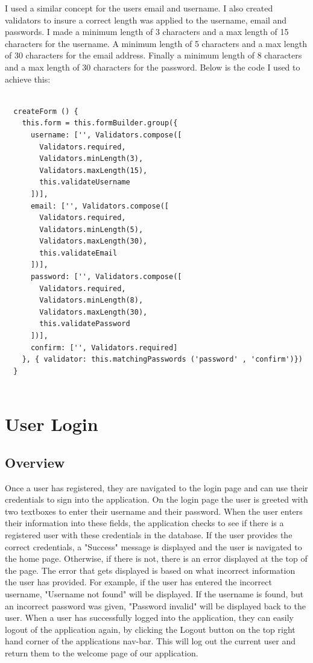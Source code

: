 I used a similar concept for the users email and username. I also created validators to insure a correct length was applied to the username, email and passwords. I made a minimum length of 3 characters and a max length of 15 characters for the username. A minimum length of 5 characters and a max length of 30 characters for the email address. Finally a minimum length of 8 characters and a max length of 30 characters for the password. Below is the code I used to achieve this:
\begin{lstlisting}

  createForm () {
    this.form = this.formBuilder.group({
      username: ['', Validators.compose([
        Validators.required,
        Validators.minLength(3),
        Validators.maxLength(15),
        this.validateUsername
      ])],
      email: ['', Validators.compose([
        Validators.required,
        Validators.minLength(5),
        Validators.maxLength(30),
        this.validateEmail
      ])],
      password: ['', Validators.compose([
        Validators.required,
        Validators.minLength(8),
        Validators.maxLength(30),
        this.validatePassword
      ])],
      confirm: ['', Validators.required]
    }, { validator: this.matchingPasswords ('password' , 'confirm')})
  }
  
\end{lstlisting}

\section{User Login}

\subsection{Overview}
Once a user has registered, they are navigated to the login page and can use their credentials to sign into the application. On the login page the user is greeted with two textboxes to enter their username and their password. When the user enters their information into these fields, the application checks to see if there is a registered user with these credentials in the database. If the user provides the correct credentials, a "Success" message is displayed and the user is navigated to the home page. Otherwise, if there is not, there is an error displayed at the top of the page. The error that gets displayed is based on what incorrect information the user has provided. For example, if the user has entered the incorrect username, "Username not found" will be displayed. If the username is found, but an incorrect password was given, "Password invalid" will be displayed back to the user. When a user has successfully logged into the application, they can easily logout of the application again, by clicking the Logout button on the top right hand corner of the applications nav-bar. This will log out the current user and return them to the welcome page of our application.

